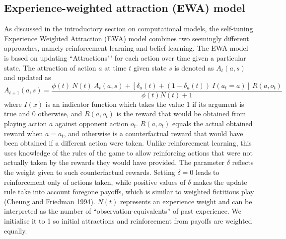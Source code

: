 \documentclass[smallextended]{svjour3}       %
\begin{document}
\hypertarget{experience-weighted-attraction-ewa-model}{%
\subsection{Experience-weighted attraction (EWA)
model}\label{experience-weighted-attraction-ewa-model}}

As discussed in the introductory section on computational models, the
self-tuning Experience Weighted Attraction (EWA) model combines two
seemingly different approaches, namely reinforcement learning and belief
learning. The EWA model is based on updating ``Attractions'\,' for each
action over time given a particular state. The attraction of action
\(a\) at time \(t\) given state \(s\) is denoted as \(A_{t}(a, s)\) and
updated as
\[ A_{t+1}(a,s) =  \frac{\phi(t) \ N(t) \ A_{t}(a,s) + [ \delta_{a}(t) + (1-\delta_{a}(t)) \ I(a_t = a )] \ R(a,o_t) } {\phi(t)N(t) + 1} \]
where \(I(x)\) is an indicator function which takes the value 1 if its
argument is true and 0 otherwise, and \(R(a,o_t)\) is the reward that
would be obtained from playing action \(a\) against opponent action
\(o_t\). \(R(a,o_t)\) equals the actual obtained reward when
\(a = a_t\), and otherwise is a counterfactual reward that would have
been obtained if a different action were taken. Unlike reinforcement
learning, this uses knowledge of the rules of the game to allow
reinforcing actions that were not actually taken by the rewards they
would have provided. The parameter \(\delta\) reflects the weight given
to such counterfactual rewards. Setting \(\delta = 0\) leads to
reinforcement only of actions taken, while positive values of \(\delta\)
makes the update rule take into account foregone payoffs, which is
similar to weighted fictitious play (Cheung and Friedman 1994). \(N(t)\)
represents an experience weight and can be interpreted as the number of
``observation-equivalents'' of past experience. We initialise it to 1 so
initial attractions and reinforcement from payoffs are weighted equally.
\end{document}
